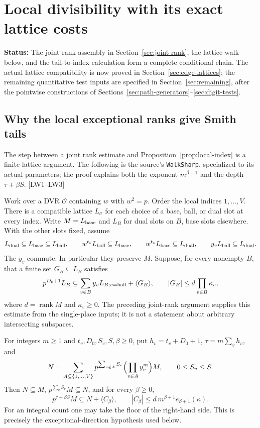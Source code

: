 \documentclass[11pt,a4paper]{article}
\numberwithin{equation}{section}
\theoremstyle{remark}\newtheorem{remark}[theorem]{Remark}
\newcommand{\status}[1]{\textbf{Status:} #1}
\begin{document}
\section{Local divisibility with its exact lattice costs}\label{sec:local-accounting}

\status{The joint-rank assembly in Section~\ref{sec:joint-rank}, the lattice walk below, and the tail-to-index calculation form a complete conditional chain. The actual lattice compatibility is now proved in Section~\ref{sec:edge-lattices}; the remaining quantitative test inputs are specified in Section~\ref{sec:remaining}, after the pointwise constructions of Sections~\ref{sec:path-generators}--\ref{sec:digit-tests}.}

\subsection{Why the local exceptional ranks give Smith tails}\label{sec:lattice-walk}

The step between a joint rank estimate and Proposition~\ref{prop:local-index} is a finite lattice argument. The following is the source's \texttt{WalkSharp}, specialized to its actual parameters; the proof explains both the exponent $m^{\beta+1}$ and the depth $\tau+\beta S$. \textsf{[LW1--LW3]}

Work over a DVR $\mathcal O$ containing $w$ with $w^2=p$. Order the local indices $1,\ldots,V$. There is a compatible lattice $L_\sigma$ for each choice of a base, ball, or dual slot at every index. Write $M=L_{\rm base}$ and $L_B$ for dual slots on $B$, base slots elsewhere. With the other slots fixed, assume
\[
 L_{\rm dual}\subseteq L_{\rm base}\subseteq L_{\rm ball},\qquad
 w^{t_v}L_{\rm ball}\subseteq L_{\rm base},\qquad
 w^{t_v}L_{\rm base}\subseteq L_{\rm dual},\qquad
 y_vL_{\rm ball}\subseteq L_{\rm dual}.
\]
The $y_v$ commute. In particular they preserve $M$. Suppose, for every nonempty $B$, that a finite set $G_B\subseteq L_B$ satisfies
\begin{equation}\label{eq:walk-joint}
 p^{D_0+1}L_B\subseteq
 \sum_{v\in B}y_vL_{B;v=\rm ball}+\langle G_B\rangle,
 \qquad |G_B|\le d\prod_{v\in B}\kappa_v,
\end{equation}
where $d=\operatorname{rank}M$ and $\kappa_v\ge0$. The preceding joint-rank argument supplies this estimate from the single-place inputs; it is not a statement about arbitrary intersecting subspaces.

For integers $m\ge1$ and $t_v,D_0,S_v,S,\beta\ge0$, put $h_v=t_v+D_0+1$, $\tau=m\sum_vh_v$, and
\[
 N=\sum_{A\subseteq\{1,\ldots,V\}}
 p^{\sum_{v\notin A}S_v}\Bigl(\prod_{v\in A}y_v^m\Bigr)M,
 \qquad 0\le S_v\le S.
\]
Then $N\subseteq M$, $p^{\sum_vS_v}M\subseteq N$, and for every $\beta\ge0$,
\begin{equation}\label{eq:walk-tail}
 p^{\tau+\beta S}M\subseteq N+\langle C_\beta\rangle,
 \qquad |C_\beta|\le d\,m^{\beta+1}e_{\beta+1}(\kappa).
\end{equation}
For an integral count one may take the floor of the right-hand side. This is precisely the exceptional-direction hypothesis used below.
\end{document}
